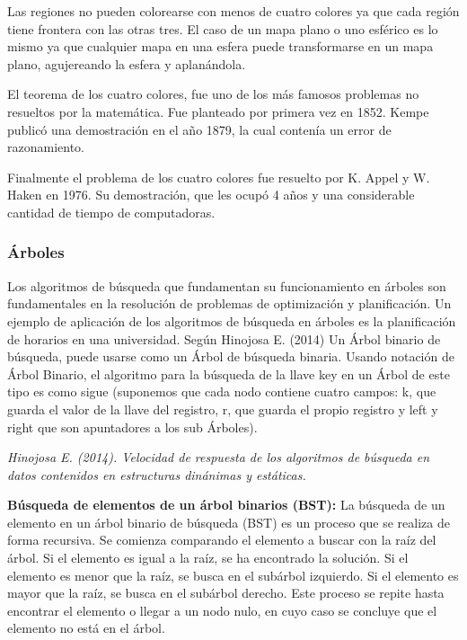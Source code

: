 \documentclass[11pt, a4paper]{article}
\begin{document}
  Las regiones no pueden colorearse con menos de cuatro colores ya que cada región tiene frontera con las otras tres. El caso de un mapa plano o uno esférico es lo mismo ya que cualquier mapa en una esfera puede transformarse en un mapa plano, agujereando la esfera y aplanándola. 

  El teorema de los cuatro colores, fue uno de los más famosos problemas no resueltos por la matemática. Fue planteado por primera vez en 1852. Kempe publicó una demostración en el año 1879, la cual contenía un error de razonamiento.

  Finalmente el problema de los cuatro colores fue resuelto por K. Appel y W. Haken en 1976. Su demostración, que les ocupó 4 años y una considerable cantidad de tiempo de computadoras. 

  
  \newpage

  \subsubsection{Árboles}

  Los algoritmos de búsqueda que fundamentan su funcionamiento en árboles son fundamentales en la resolución de problemas de optimización y planificación. Un ejemplo de aplicación de los algoritmos de búsqueda en árboles es la planificación de horarios en una universidad. Según Hinojosa E. (2014) Un Árbol binario de búsqueda, puede usarse como un Árbol de búsqueda binaria. Usando notación de Árbol Binario, el algoritmo para la búsqueda de la llave key en un Árbol de este tipo es como sigue (suponemos que cada nodo contiene cuatro campos: k, que guarda el valor de la llave del registro, r, que guarda el propio registro y left y right que son apuntadores a los sub Árboles).

  \begin{flushright}
    \textit{Hinojosa E. (2014). Velocidad de respuesta de los algoritmos de búsqueda en datos contenidos en estructuras dinánimas y estáticas.}
  \end{flushright}

  \textbf{Búsqueda de elementos de un árbol binarios (BST):} La búsqueda de un elemento en un árbol binario de búsqueda (BST) es un proceso que se realiza de forma recursiva. Se comienza comparando el elemento a buscar con la raíz del árbol. Si el elemento es igual a la raíz, se ha encontrado la solución. Si el elemento es menor que la raíz, se busca en el subárbol izquierdo. Si el elemento es mayor que la raíz, se busca en el subárbol derecho. Este proceso se repite hasta encontrar el elemento o llegar a un nodo nulo, en cuyo caso se concluye que el elemento no está en el árbol.
\end{document}

